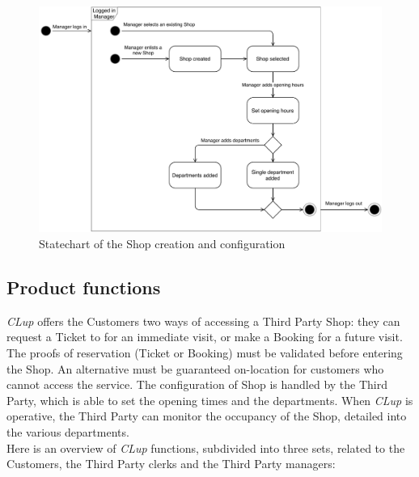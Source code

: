 \begin{figure}[H]
    \includegraphics[width=\linewidth]{Images/state-diag_Manager.pdf}
    \caption{Statechart of the Shop creation and configuration}
    \label{fig:statechart_manager}
\end{figure}



\subsection{Product functions}
\emph{CLup} offers the Customers two ways of accessing a Third Party Shop: they can request a Ticket to for an immediate visit, or make a Booking for a future visit. The proofs of reservation (Ticket or Booking) must be validated before entering the Shop. An alternative must be guaranteed on-location for customers who cannot access the service.
The configuration of Shop is handled by the Third Party, which is able to set the opening times and the departments. When \emph{CLup} is operative, the Third Party can monitor the occupancy of the Shop, detailed into the various departments.
\\Here is an overview of \emph{CLup} functions, subdivided into three sets, related to the Customers, the Third Party clerks and the Third Party managers:

